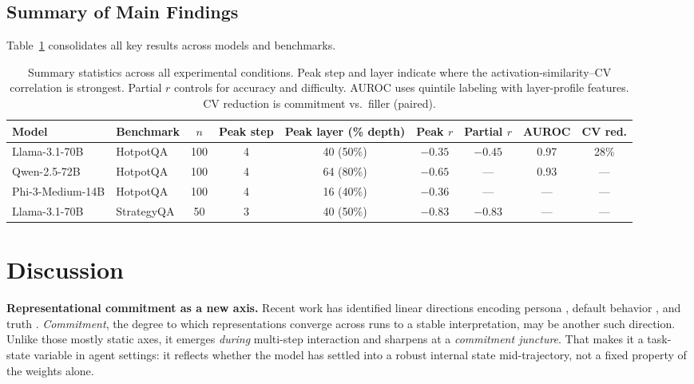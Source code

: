 \documentclass{article}
\begin{document}
\subsection{Summary of Main Findings}

Table~\ref{tab:summary} consolidates all key results across models and benchmarks.

\begin{table}[t]
\centering
\caption{Summary statistics across all experimental conditions. Peak step and layer indicate where the activation-similarity--CV correlation is strongest. Partial $r$ controls for accuracy and difficulty. AUROC uses quintile labeling with layer-profile features. CV reduction is commitment vs.\ filler (paired).}
\label{tab:summary}
\small
\begin{tabular}{llccccccc}
\toprule
\textbf{Model} & \textbf{Benchmark} & $n$ & \textbf{Peak step} & \textbf{Peak layer (\% depth)} & \textbf{Peak $r$} & \textbf{Partial $r$} & \textbf{AUROC} & \textbf{CV red.} \\
\midrule
Llama-3.1-70B & HotpotQA   & 100 & 4 & 40 (50\%) & $-0.35$ & $-0.45$ & 0.97 & 28\% \\
Qwen-2.5-72B  & HotpotQA   & 100 & 4 & 64 (80\%) & $-0.65$ & ---     & 0.93 & --- \\
Phi-3-Medium-14B & HotpotQA & 100 & 4 & 16 (40\%) & $-0.36$ & ---     & ---  & --- \\
Llama-3.1-70B & StrategyQA  &  50 & 3 & 40 (50\%) & $-0.83$ & $-0.83$ & ---  & --- \\
\bottomrule
\end{tabular}
\end{table}

\section{Discussion}

\textbf{Representational commitment as a new axis.} Recent work has identified linear directions encoding persona \citep{anthropic_persona}, default behavior \citep{anthropic_axis}, and truth \citep{marks2024geometry}. \emph{Commitment}, the degree to which representations converge across runs to a stable interpretation, may be another such direction. Unlike those mostly static axes, it emerges \emph{during} multi-step interaction and sharpens at a \emph{commitment juncture}. That makes it a task-state variable in agent settings: it reflects whether the model has settled into a robust internal state mid-trajectory, not a fixed property of the weights alone.
\end{document}
